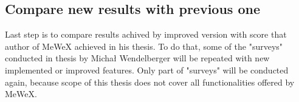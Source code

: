 \subsection{Compare new results with previous one}
Last step is to compare results achived by improved version with score that author of MeWeX achieved in his thesis.
To do that, some of the "surveys" conducted in thesis by Michał Wendelberger will be repeated with new implemented or improved features. 
Only part of "surveys" will be conducted again, because scope of this thesis does not cover all functionalities offered by MeWeX.